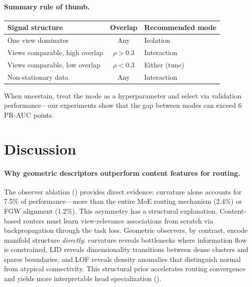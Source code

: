 \documentclass[11pt,a4paper]{article}
\begin{document}
\paragraph{Summary rule of thumb.}
\begin{center}
\begin{tabular}{@{}lcl@{}}
\toprule
Signal structure & Overlap & Recommended mode \\
\midrule
One view dominates & Any & Isolation \\
Views comparable, high overlap & $\rho > 0.3$ & Interaction \\
Views comparable, low overlap & $\rho < 0.3$ & Either (tune) \\
Non-stationary data & Any & Interaction \\
\bottomrule
\end{tabular}
\end{center}

When uncertain, treat the mode as a hyperparameter and select via
validation performance---our experiments show that the gap between modes
can exceed 6 PR-AUC points.


\section{Discussion}
\label{sec:discussion}

\paragraph{Why geometric descriptors outperform content features for routing.}
The observer ablation () provides direct
evidence: curvature alone accounts for 7.5\% of performance---more than
the entire MoE routing mechanism (2.4\%) or FGW alignment (1.2\%).
This asymmetry has a structural explanation.
Content-based routers must learn view-relevance associations from
scratch via backpropagation through the task loss.
Geometric observers, by contrast, encode manifold structure
\emph{directly}: curvature reveals bottlenecks where information flow
is constrained, LID reveals dimensionality transitions between dense
clusters and sparse boundaries, and LOF reveals density anomalies that
distinguish normal from atypical connectivity.
This structural prior accelerates routing convergence and yields more
interpretable head specialization ().
\end{document}

